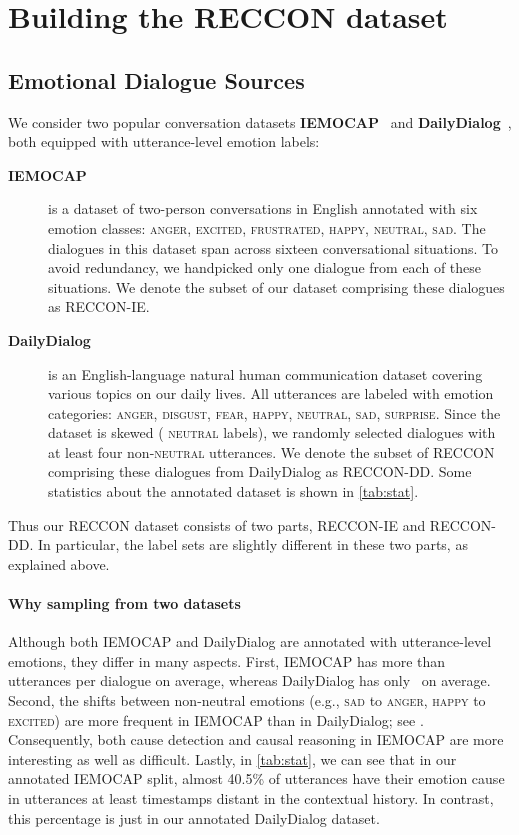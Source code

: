 \documentclass[smallextended]{svjour3}
\newcommand\emo[1]{\textsc{#1}}
\newcommand\RECCONDA{RECCON}
\newcommand\RECCONDADD{RECCON-DD}
\newcommand\RECCONDAIE{RECCON-IE}
\newcommand\DailyDialog{Daily\-Dialog}
\newcommand\0{\hphantom{0}}
\begin{document}
\section{Building the \RECCONDA{} dataset}\label{sec:dataset}

\subsection{Emotional Dialogue Sources}
We consider two popular conversation datasets \textbf{IEMOCAP}~\cite{iemocap} and \textbf{\DailyDialog{}}~\cite{li2017DailyDialog}, both equipped with utterance-level emotion labels:



\begin{description}
\item[\textbf{IEMOCAP}] is a dataset of two-person conversations in English annotated with six emotion classes: \emo{anger}, \emo{excited}, \emo{frustrated}, \emo{happy}, \emo{neutral}, 
\emo{sad}. The dialogues in this dataset span across sixteen 
conversational situations. To avoid redundancy, we handpicked only one dialogue from each of these situations. We denote the subset of our 
dataset comprising these dialogues as 
\RECCONDAIE{}.

\item[\textbf{\DailyDialog{}}] is an English-language natural human communication dataset covering various topics on our daily lives. All utterances are labeled with emotion categories: \emo{anger}, \emo{disgust}, \emo{fear}, \emo{happy}, \emo{neutral}, \emo{sad}, 
\emo{surprise}. Since the dataset is skewed 
( \emo{neutral} labels),
we randomly selected dialogues 
with
at least four non-\emo{neutral} utterances. We denote the subset of \RECCONDA{} comprising these dialogues from \DailyDialog{} as \RECCONDADD. Some statistics about the annotated dataset is shown in \cref{tab:stat}.
\end{description}
Thus our RECCON dataset consists of two parts, \RECCONDAIE{} and \RECCONDADD{}. In particular, the label sets are slightly different in these two parts, as explained above.
\paragraph{Why
sampling from two 
datasets} 
\label{sec:dataset_diffs}
Although both IEMOCAP and \DailyDialog{} are annotated with utterance-level emotions, they differ in many aspects. First, 
IEMOCAP has more than  utterances per dialogue on average,
whereas \DailyDialog{} has 
only~ on average. Second, the shifts between non-neutral emotions (e.g., \emo{sad} to \emo{anger}, \emo{happy} to \emo{excited}) are more frequent in IEMOCAP than in \DailyDialog{}; see \citep{ghosal2020utterancelevel}. Consequently, both cause detection and causal reasoning in IEMOCAP are more interesting as well as difficult. Lastly, in \cref{tab:stat}, we can see that in our annotated IEMOCAP split, almost 40.5\% of utterances have their emotion cause in utterances at least  timestamps distant in the contextual history. 
In contrast,
this percentage is just  in our annotated \DailyDialog{} dataset. 
\end{document}
